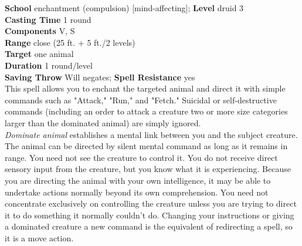 \textbf{School} enchantment (compulsion) [mind-affecting]; \textbf{Level} druid 3\\
\textbf{Casting Time} 1 round\\
\textbf{Components} V, S\\
\textbf{Range} close (25 ft. + 5 ft./2 levels)\\
\textbf{Target} one animal\\
\textbf{Duration} 1 round/level\\
\textbf{Saving Throw }Will negates; \textbf{Spell Resistance} yes\\
This spell allows you to enchant the targeted animal and direct it with simple commands such as "Attack," "Run," and "Fetch." Suicidal or self-destructive commands (including an order to attack a creature two or more size categories larger than the dominated animal) are simply ignored.\\
\textit{Dominate animal }establishes a mental link between you and the subject creature. The animal can be directed by silent mental command as long as it remains in range. You need not see the creature to control it. You do not receive direct sensory input from the creature, but you know what it is experiencing. Because you are directing the animal with your own intelligence, it may be able to undertake actions normally beyond its own comprehension. You need not concentrate exclusively on controlling the creature unless you are trying to direct it to do something it normally couldn't do. Changing your instructions or giving a dominated creature a new command is the equivalent of redirecting a spell, so it is a move action.\\
